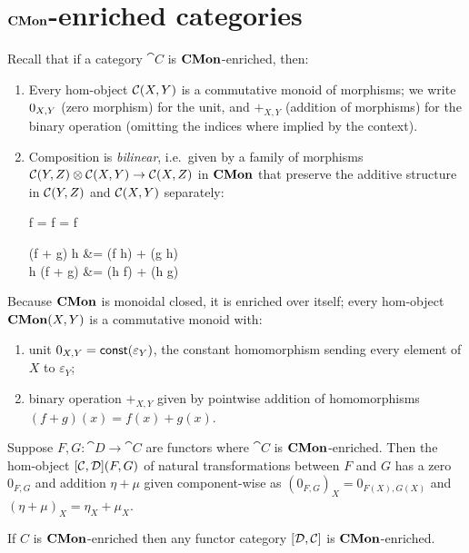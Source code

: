 \section{$\mathbf{CMon}$-enriched categories}
\label{sec:cmon-enriched}

Recall that if a category $\cat{C}$ is $\mathbf{CMon}$-enriched, then:
\begin{enumerate}
\item Every hom-object ${\mathcal{C}}(X,Y)$ is a commutative monoid of morphisms; we write $0_{X,Y}$
(zero morphism) for the unit, and $+_{X,Y}$ (addition of morphisms) for the binary operation (omitting the
indices where implied by the context).
\item Composition is \emph{bilinear}, i.e.~given by a family of morphisms ${\mathcal{C}}(Y,Z) \otimes
{\mathcal{C}}(X,Y) \to {\mathcal{C}}(X,Z)$ in $\mathbf{CMon}$ that preserve the additive structure in
${\mathcal{C}}(Y,Z)$ and ${\mathcal{C}}(X,Y)$ separately:

\begin{salign*}
f \comp \zero = f = \zero \comp f
\end{salign*}
\begin{salign*}
(f + g) \comp h &= (f \comp h) + (g \comp h) \\
h \comp (f + g) &= (h \comp f) + (h \comp g)
\end{salign*}
\end{enumerate}

Because $\mathbf{CMon}$ is monoidal closed, it is enriched over itself; every hom-object ${\mathbf{CMon}}(X,Y)$ is a
commutative monoid with:

\begin{enumerate}
\item unit $0_{X,Y} = \mathsf{const}(\varepsilon_Y)$, the constant homomorphism sending every element of $X$ to
$\varepsilon_Y$;
\item binary operation $+_{X,Y}$ given by pointwise addition of homomorphisms $(f + g)(x) = f(x) + g(x)$.
\end{enumerate}

Suppose $F, G: \cat{D} \to \cat{C}$ are functors where $\cat{C}$ is $\mathbf{CMon}$-enriched. Then the hom-object
${[\mathcal{C},\mathcal{D}]}(F,G)$ of natural transformations between $F$ and $G$ has a zero $0_{F,G}$ and
addition $\eta + \mu$ given component-wise as $(0_{F,G})_X = 0_{F(X),G(X)}$ and $(\eta + \mu)_X = \eta_X +
\mu_X$.

\begin{proposition}
If $C$ is $\mathbf{CMon}$-enriched then any functor category $[\mathcal{D},\mathcal{C}]$ is $\mathbf{CMon}$-enriched.
\end{proposition}

